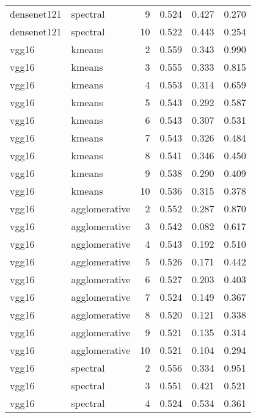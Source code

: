 \begin{longtable}{llrrrr}
densenet121 &      spectral &  9 &            0.524 &   0.427 &    0.270 \\
densenet121 &      spectral & 10 &            0.522 &   0.443 &    0.254 \\
      vgg16 &        kmeans &  2 &            0.559 &   0.343 &    0.990 \\
      vgg16 &        kmeans &  3 &            0.555 &   0.333 &    0.815 \\
      vgg16 &        kmeans &  4 &            0.553 &   0.314 &    0.659 \\
      vgg16 &        kmeans &  5 &            0.543 &   0.292 &    0.587 \\
      vgg16 &        kmeans &  6 &            0.543 &   0.307 &    0.531 \\
      vgg16 &        kmeans &  7 &            0.543 &   0.326 &    0.484 \\
      vgg16 &        kmeans &  8 &            0.541 &   0.346 &    0.450 \\
      vgg16 &        kmeans &  9 &            0.538 &   0.290 &    0.409 \\
      vgg16 &        kmeans & 10 &            0.536 &   0.315 &    0.378 \\
      vgg16 & agglomerative &  2 &            0.552 &   0.287 &    0.870 \\
      vgg16 & agglomerative &  3 &            0.542 &   0.082 &    0.617 \\
      vgg16 & agglomerative &  4 &            0.543 &   0.192 &    0.510 \\
      vgg16 & agglomerative &  5 &            0.526 &   0.171 &    0.442 \\
      vgg16 & agglomerative &  6 &            0.527 &   0.203 &    0.403 \\
      vgg16 & agglomerative &  7 &            0.524 &   0.149 &    0.367 \\
      vgg16 & agglomerative &  8 &            0.520 &   0.121 &    0.338 \\
      vgg16 & agglomerative &  9 &            0.521 &   0.135 &    0.314 \\
      vgg16 & agglomerative & 10 &            0.521 &   0.104 &    0.294 \\
      vgg16 &      spectral &  2 &            0.556 &   0.334 &    0.951 \\
      vgg16 &      spectral &  3 &            0.551 &   0.421 &    0.521 \\
      vgg16 &      spectral &  4 &            0.524 &   0.534 &    0.361 \\

\end{longtable}
